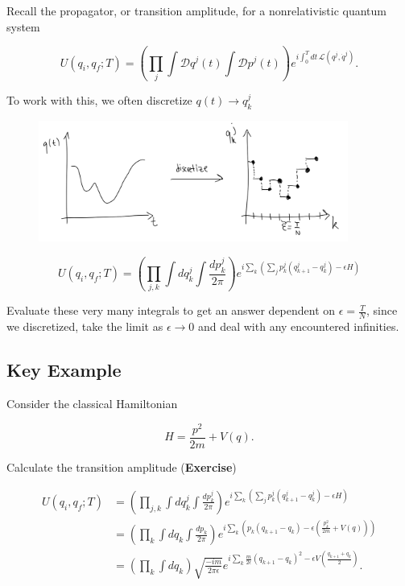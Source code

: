 \noindent Recall the propagator, or transition amplitude, for a nonrelativistic quantum system

\begin{equation}
U(q_i, q_f; T) = \left( \prod_j \int \mathcal{D} q^j (t) \int \mathcal{D} p^j (t) \right) e^{i \int^T_0 dt \, \mathcal{L} (q^j, \dot{q}^j)}.
\end{equation}

\noindent To work with this, we often discretize $q(t) \rightarrow q^j_k$

\begin{figure}[H]
	\centering
	\includegraphics[width=4in]{images/discretize.png}
\end{figure}

\begin{equation}
U(q_i, q_f; T) = \left( \prod_{j, k} \int dq^j_k \int \frac{dp^j_k}{2\pi} \right) e^{i \sum_k (\sum_j p_k^j (q_{k+1}^j - q_k^j ) - \epsilon H)}
\end{equation}

\noindent Evaluate these very many integrals to get an answer dependent on $\epsilon = \frac{T}{N}$, since we discretized, take the limit as $\epsilon \rightarrow 0$ and deal with any encountered infinities.

\subsection*{Key Example}

\noindent Consider the classical Hamiltonian

\begin{equation}
H = \frac{p^2}{2 m} + V(q).
\end{equation}

\noindent Calculate the transition amplitude (\textbf{Exercise})

\begin{align}
U(q_i, q_f; T) &= \left( \prod_{j, k} \int dq^j_k \int \frac{dp^j_k}{2\pi} \right) e^{i \sum_k (\sum_j p_k^j (q_{k+1}^j - q_k^j ) - \epsilon H)} \\
&=  \left( \prod_{k} \int dq_k \int \frac{dp_k}{2\pi} \right) e^{i \sum_k (p_k (q_{k+1} - q_k ) - \epsilon (\frac{p_k^2}{2m} + V(q)) )} \\
&= \left( \prod_k \int dq_k \right) \sqrt{\frac{-im}{2\pi \epsilon}} e^{i \sum_k \frac{m}{2\epsilon} (q_{k+1} - q_k)^2 - \epsilon V(\frac{q_{k+1} + q_k}{2})}.
\end{align}

